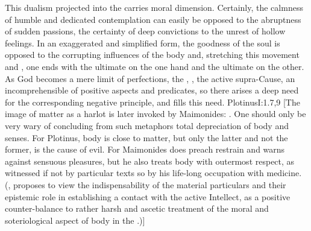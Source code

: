 \pa This dualism projected into the  carries moral dimension.
Certainly, the calmness of humble and dedicated contemplation can easily be
opposed to the abruptness of sudden passions, the certainty of deep convictions
to the unrest of hollow feelings. In an exaggerated and simplified form, the
goodness of the soul is opposed to the corrupting influences of the body and,
stretching this movement  and , one ends with the
ultimate  on the one hand and the ultimate  on the other.
As God becomes a mere limit of perfections, the ,
, the active supra-Cause, an incomprehensible 
of positive aspects and predicates, so there arises a deep need for the
corresponding negative principle, and  fills this need.  \citet{As
  necessarily as there is Something after the First, so necessarily there is a
  Last: this Last is Matter, the thing which has no residue of good in it: here
  is the necessity of Evil. [...] Matter becomes mistress of what is manifested
  through it: it corrupts and destroys the incomer.}{Plotinus}{I:1.7,9 [The
  image of matter as a harlot is later invoked by Maimonides: . One should only be very wary of
  concluding from such metaphors total depreciation of body and senses. For
  Plotinus, body is close to matter, but only the latter and not the former, is
  the cause of evil. For  Maimonides does
  preach restrain and warns against sensuous pleasures, but he also treats body
  with outermost respect, as witnessed if not by particular texts so by his
  life-long occupation with medicine.  (\citeauthor*{MaimonMatter}, proposes to
  view the indispensability of the material particulars and their epistemic role
  in establishing a contact with the active Intellect, as a positive
  counter-balance to rather harsh and ascetic treatment of the moral and
  soteriological aspect of body in the .)]}
